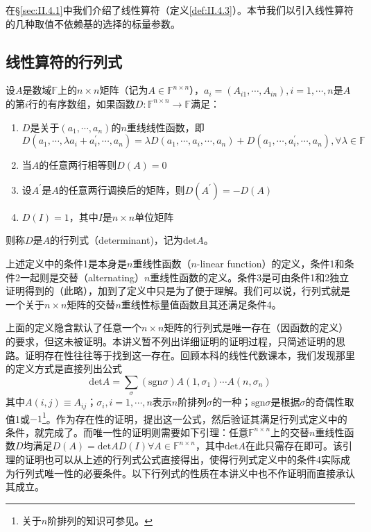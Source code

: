 \documentclass[main.tex]{subfiles}
\begin{document}
在\S\ref{sec:II.4.1}中我们介绍了线性算符（定义\ref{def:II.4.3}）。本节我们以引入线性算符的几种取值不依赖基的选择的标量参数。

\subsection{线性算符的行列式}
\begin{definition}
设$A$是数域$\mathbb{F}$上的$n\times n$矩阵（记为$A\in\mathbb{F}^{n\times n}$），$a_i=\left(A_{i1},\cdots,A_{in}\right),i=1,\cdots,n$是$A$的第$i$行的有序数组，如果函数$D:\mathbb{F}^{n\times n}\rightarrow\mathbb{F}$满足：
\begin{enumerate}
\item $D$是关于$\left(a_1,\cdots,a_n\right)$的$n$重线线性函数，即
\[
D\left(a_1,\cdots,\lambda a_i+a^\prime_i,\cdots,a_n\right)=\lambda D\left(a_1,\cdots,a_i,\cdots,a_n\right)+D\left(a_1,\cdots,a^\prime_i,\cdots,a_n\right),\forall\lambda\in\mathbb{F}
\]
\item 当$A$的任意两行相等则$D\left(A\right)=0$
\item 设$A^\prime$是$A$的任意两行调换后的矩阵，则$D\left(A^\prime\right)=-D\left(A\right)$
\item $D\left(I\right)=1$，其中$I$是$n\times n$单位矩阵
\end{enumerate}
则称$D$是$A$的行列式（determinant)，记为$\mathrm{det}A$。
\end{definition}
上述定义中的条件1是本身是$n$重线性函数（$n$-linear function）的定义，条件1和条件2一起则是交替（alternating）$n$重线性函数的定义。条件3是可由条件1和2独立证明得到的（此略\cite[\S 5.2,pp.~144\~146]{Hoffman1971}），加到了定义中只是为了便于理解。我们可以说，行列式就是一个关于$n\times n$矩阵的交替$n$重线性标量值函数且其还满足条件4。

上面的定义隐含默认了任意一个$n\times n$矩阵的行列式是唯一存在（因函数的定义）的要求，但这未被证明。本讲义暂不列出详细证明的证明过程，只简述证明的思路。证明存在性往往等于找到这一存在。回顾本科的线性代数课本，我们发现那里的定义方式\cite[\S 1.3“定义3.1”,p.~7]{周胜林2012线性代数}是直接列出公式
\[
\mathrm{det}A=\sum_{\sigma}\left(\mathrm{sgn}\sigma\right)A\left(1,\sigma_1\right)\cdots A\left(n,\sigma_n\right)
\]
其中$A\left(i,j\right)\equiv A_{ij}$；$\sigma_i,i=1,\cdots,n$表示$n$阶排列$\sigma$的一种；$\mathrm{sgn}\sigma$是根据$\sigma$的奇偶性取值1或$-1$\footnote{关于$n$阶排列的知识可参见\cite[\S1.2,p.~4]{周胜林2012线性代数}。}。作为存在性的证明，提出这一公式，然后验证其满足行列式定义中的条件，就完成了。而唯一性的证明则需要如下引理：任意$\mathbb{F}^{n\times n}$上的交替$n$重线性函数$D$均满足$D\left(A\right)=\mathrm{det}AD\left(I\right)\forall A\in\mathbb{F}^{n\times n}$，其中$\mathrm{det}A$在此只需存在即可。该引理的证明也可以从上述的行列式公式直接得出，使得行列式定义中的条件4实际成为行列式唯一性的必要条件。以下行列式的性质在本讲义中也不作证明而直接承认其成立。
\end{document}

